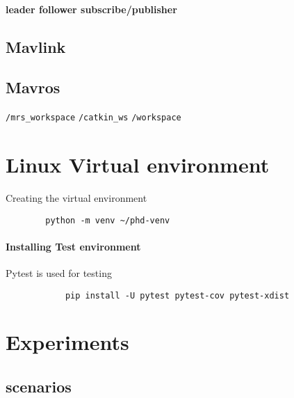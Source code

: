         \paragraph{leader follower subscribe/publisher}
    
    \subsection{Mavlink}
    \subsection{Mavros}
        \texttt{/mrs\_workspace}
        \texttt{/catkin\_ws}
        \texttt{/workspace}

\section{Linux Virtual environment}
    Creating the virtual environment
    \begin{verbatim}
        python -m venv ~/phd-venv
    \end{verbatim}
    \paragraph{Installing Test environment}
        Pytest is used for testing
        \begin{verbatim}
            pip install -U pytest pytest-cov pytest-xdist
        \end{verbatim}

\section{Experiments}
    \subsection{scenarios}
